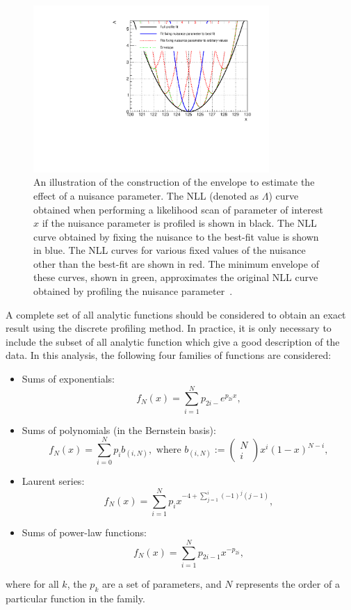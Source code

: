 \begin{figure}[ht!]
\centering
\includegraphics[width=0.8\textwidth]{modellingFigures/envelope_cartoon.pdf} 
\caption{An illustration of the construction of the envelope to estimate the effect of a nuisance parameter. The NLL (denoted as $\Lambda$) curve obtained when performing a likelihood scan of parameter of interest $x$ if the nuisance parameter is profiled is shown in black. The NLL curve obtained by fixing the nuisance to the best-fit value is shown in blue. The NLL curves for various fixed values of the nuisance other than the best-fit are shown in red. The minimum envelope of these curves, shown in green, approximates the original NLL curve obtained by profiling the nuisance parameter~\cite{DiscreteProfiling}.}

\label{fig:model:bkg_envelope}
\end{figure}

A complete set of all analytic functions should be considered to obtain an exact result using the discrete profiling method. In practice, it is only necessary to include the subset of all analytic function which give a good description of the data. In this analysis, the following four families of functions are considered:

\begin{itemize}
\item Sums of exponentials: $$ f_{N}(x)= \sum^{N}_{i=1} p_{2i-} e^{p_{2i} x} ,$$
\item Sums of polynomials (in the Bernstein basis): $$ f_{N}(x) = \sum^{N}_{i=0} p_{i} b_{(i,N)}, \text{ where } b_{(i,N)}:= \begin{pmatrix} N \\ i \end{pmatrix} x^i (1-x)^{N-i} ,$$
\item Laurent series: $$ f_{N}(x)= \sum^{N}_{i=1} p_{i} x^{-4 + \sum^{i}_{j=1} (-1)^{j} (j-1)},$$
\item Sums of power-law functions: $$ f_{N}(x)= \sum^{N}_{i=1} p_{2i-1} x^{-p_{2i}},$$
\end{itemize}
where for all $k$, the $p_k$ are a set of parameters, and $N$ represents the order of a particular function in the family.  

